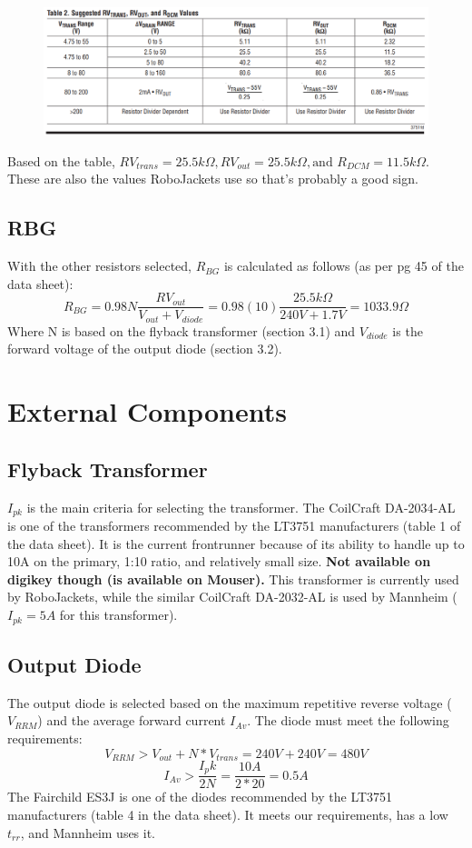 \documentclass{article}
\begin{document}
	\begin{figure}[h!]
		\includegraphics[width=\linewidth]{LT3571_Resistor_Values.png}
	\end{figure}

	\noindent Based on the table, $RV_{trans} = 25.5k\Omega, RV_{out} = 25.5k\Omega, \text{and } R_{DCM} = 11.5k\Omega$. These are also the values RoboJackets use so that's probably a good sign.

	\subsection{RBG}
	With the other resistors selected, $R_{BG}$ is calculated as follows (as per pg 45 of the data sheet):
	\[R_{BG} = 0.98N\dfrac{RV_{out}}{V_{out} + V_{diode}} = 0.98(10)\dfrac{25.5k\Omega}{240V + 1.7V} = 1033.9\Omega\]
	Where N is based on the flyback transformer (section 3.1) and $V_{diode}$ is the forward voltage of the output diode (section 3.2).
	
	\section{External Components}
	\subsection{Flyback Transformer}
	$I_{pk}$ is the main criteria for selecting the transformer. The CoilCraft DA-2034-AL is one of the transformers recommended by the LT3751 manufacturers (table 1 of the data sheet). It is the current frontrunner because of its ability to handle up to 10A on the primary, 1:10 ratio, and relatively small size. \textbf{Not available on digikey though (is available on Mouser).} This transformer is currently used by RoboJackets, while the similar CoilCraft DA-2032-AL is used by Mannheim ($I_{pk} = 5A$ for this transformer).
	\subsection{Output Diode}
	The output diode is selected based on the maximum repetitive reverse voltage ($V_{RRM}$) and the average forward current $I_{Av}$. The diode must meet the following requirements:
	\[V_{RRM} > V_{out} + N*V_{trans} = 240V + 240V  = 480V\]
	\[I_{Av} > \dfrac{I_pk}{2N} = \dfrac{10A}{2*20} = 0.5A\]  
	The Fairchild ES3J is one of the diodes recommended by the LT3751 manufacturers (table 4 in the data sheet). It meets our requirements, has a low $t_{rr}$, and Mannheim uses it. 
\end{document}
